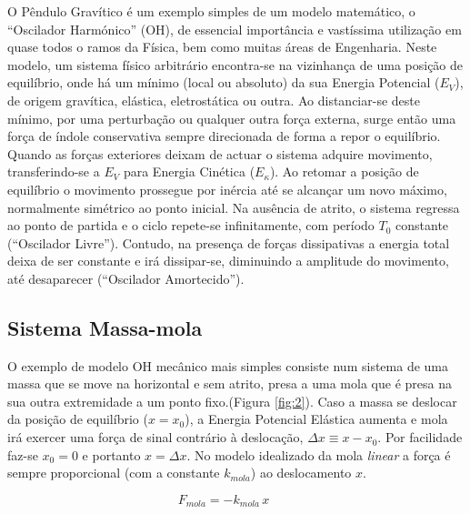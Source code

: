 \documentclass[a4paper,twoside,12pt]{article}      %
\begin{document}
O Pêndulo Gravítico é um exemplo simples de um modelo  matemático, o ``Oscilador Harmónico'' (OH), 
de essencial importância e  vastíssima utilização em quase todos o ramos da Física,
 bem como muitas áreas de Engenharia. 
 Neste modelo, um sistema físico arbitrário encontra-se na vizinhança de uma posição 
 de equilíbrio, onde há um mínimo (local ou absoluto) da sua Energia Potencial ($E_V$), de origem gravítica, elástica, eletrostática ou outra. 
Ao distanciar-se deste mínimo, por uma perturbação ou qualquer outra força externa, 
surge então uma força de índole conservativa sempre direcionada de forma a repor o equilíbrio. 
Quando as forças exteriores deixam de actuar o sistema adquire movimento, 
transferindo-se a $E_V$ para Energia Cinética ($E_\kappa$). 
Ao retomar a posição de equilíbrio  o movimento  prossegue por inércia  até se alcançar um 
novo máximo, normalmente simétrico ao ponto inicial. 
Na ausência de atrito, o sistema regressa  ao ponto de partida e o ciclo repete-se infinitamente, com período $T_0$ constante (``Oscilador Livre''). Contudo, na presença de  forças dissipativas a energia total deixa de ser constante e irá dissipar-se, diminuindo a amplitude do movimento, até desaparecer (``Oscilador Amortecido'').

\subsection{\sf Sistema Massa-mola}
O exemplo de modelo OH mecânico mais simples  consiste num sistema de uma massa que se 
move na horizontal e sem atrito,  presa a uma mola  que é presa na sua outra extremidade a um ponto fixo.(Figura \ref{fig:2}). 
Caso a massa se deslocar da posição de equilíbrio ($x =x_0$), a Energia Potencial Elástica aumenta e mola irá exercer uma força de sinal contrário à deslocação, $\Delta x \equiv x - x_0$. Por facilidade faz-se $ x_0= 0$ e portanto  $x=\Delta x$.
No modelo idealizado da mola \emph{linear} a força é sempre proporcional (com a constante $k_{mola}$) ao deslocamento $x$. 

\begin{equation}
F_{mola} = - k_{mola} \, x \qquad 
\end{equation}
\end{document}
